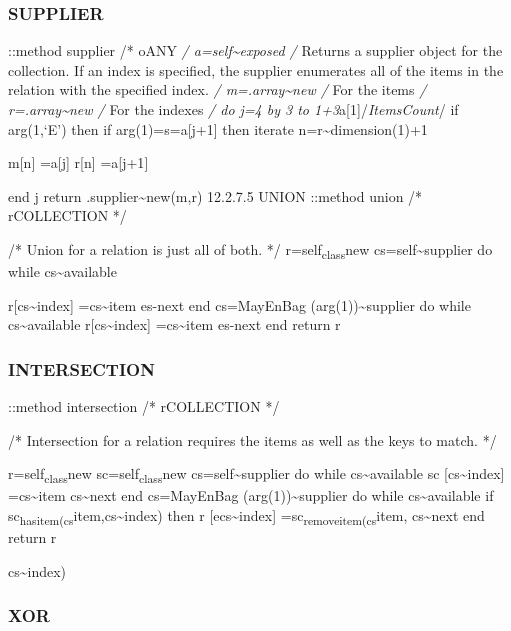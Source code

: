 \subsubsection{SUPPLIER}\label{supplier-1}

::method supplier /* oANY \emph{/ a=self\textasciitilde exposed /}
Returns a supplier object for the collection. If an index is specified,
the supplier enumerates all of the items in the relation with the
specified index. \emph{/ m=.array\textasciitilde new /} For the items
\emph{/ r=.array\textasciitilde new /} For the indexes \emph{/ do j=4 by
3 to 1+3}a{[}1{]}/\emph{ItemsCount}/ if arg(1,`E') then if
arg(1)=s=a{[}j+1{]} then iterate n=r\textasciitilde dimension(1)+1

m{[}n{]} =a{[}j{]} r{[}n{]} =a{[}j+1{]}

end j return .supplier\textasciitilde new(m,r) 12.2.7.5 UNION ::method
union /* rCOLLECTION */

/* Union for a relation is just all of both. */
r=self\textsubscript{class}new cs=self\textasciitilde supplier do while
cs\textasciitilde available

r{[}cs\textasciitilde index{]} =cs\textasciitilde item es-next end
cs=MayEnBag (arg(1))\textasciitilde supplier do while
cs\textasciitilde available r{[}cs\textasciitilde index{]}
=cs\textasciitilde item es-next end return r

\subsubsection{INTERSECTION}\label{intersection-2}

::method intersection /* rCOLLECTION */

/* Intersection for a relation requires the items as well as the keys to
match. */

r=self\textsubscript{class}new sc=self\textsubscript{class}new
cs=self\textasciitilde supplier do while cs\textasciitilde available sc
{[}cs\textasciitilde index{]} =cs\textasciitilde item
cs\textasciitilde next end cs=MayEnBag (arg(1))\textasciitilde supplier
do while cs\textasciitilde available if
sc\textsubscript{hasitem(cs}item,cs\textasciitilde index) then r
{[}ecs\textasciitilde index{]} =sc\textsubscript{removeitem(cs}item,
cs\textasciitilde next end return r

cs\textasciitilde index)

\subsubsection{XOR}\label{xor-2}

